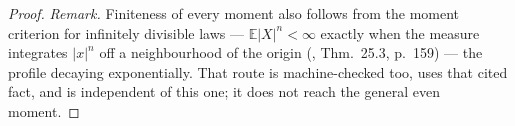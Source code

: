 \begin{proof}
\emph{Remark.} Finiteness of every moment also follows from the moment criterion for
infinitely divisible laws --- $\mathbb{E}|X|^n < \infty$ exactly when the \Levy{} measure
integrates $|x|^n$ off a neighbourhood of the origin (, Thm.~25.3,
p.~159) --- the profile decaying exponentially. That route is machine-checked too, uses
that cited fact, and is independent of this one; it does not reach the general even moment.
\end{proof}
